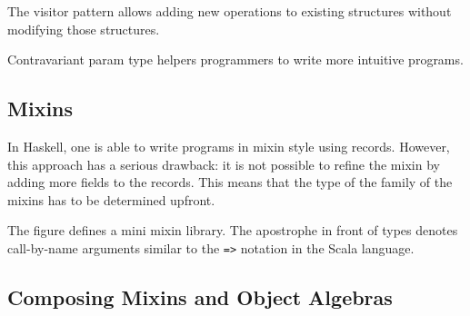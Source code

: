 The visitor pattern allows adding new operations to existing structures without
modifying those structures.



Contravariant param type helpers programmers to write more intuitive programs.



\subsection{Mixins}



In Haskell, one is able to write programs in mixin style using records. However,
this approach has a serious drawback: it is not possible to refine the mixin by
adding more fields to the records. This means that the type of the family of the
mixins has to be determined upfront.

The figure defines a mini mixin library. The apostrophe in front of types
denotes call-by-name arguments similar to the \lstinline{=>} notation in the
Scala language.

\subsection{Composing Mixins and Object Algebras}
